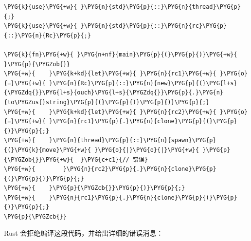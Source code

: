 \begin{Verbatim}[commandchars=\\\{\},breaklines=true,breakanywhere=true,fontsize=\codefont,xleftmargin=17bp]
\PYG{k}{use}\PYG{+w}{ }\PYG{n}{std}\PYG{p}{::}\PYG{n}{thread}\PYG{p}{;}
\PYG{k}{use}\PYG{+w}{ }\PYG{n}{std}\PYG{p}{::}\PYG{n}{rc}\PYG{p}{::}\PYG{n}{Rc}\PYG{p}{;}

\PYG{k}{fn}\PYG{+w}{ }\PYG{n+nf}{main}\PYG{p}{(}\PYG{p}{)}\PYG{+w}{ }\PYG{p}{\PYGZob{}}
\PYG{+w}{    }\PYG{k+kd}{let}\PYG{+w}{ }\PYG{n}{rc1}\PYG{+w}{ }\PYG{o}{=}\PYG{+w}{ }\PYG{n}{Rc}\PYG{p}{::}\PYG{n}{new}\PYG{p}{(}\PYG{l+s}{\PYGZdq{}}\PYG{l+s}{ouch}\PYG{l+s}{\PYGZdq{}}\PYG{p}{.}\PYG{n}{to\PYGZus{}string}\PYG{p}{(}\PYG{p}{)}\PYG{p}{)}\PYG{p}{;}
\PYG{+w}{    }\PYG{k+kd}{let}\PYG{+w}{ }\PYG{n}{rc2}\PYG{+w}{ }\PYG{o}{=}\PYG{+w}{ }\PYG{n}{rc1}\PYG{p}{.}\PYG{n}{clone}\PYG{p}{(}\PYG{p}{)}\PYG{p}{;}
\PYG{+w}{    }\PYG{n}{thread}\PYG{p}{::}\PYG{n}{spawn}\PYG{p}{(}\PYG{k}{move}\PYG{+w}{ }\PYG{o}{|}\PYG{o}{|}\PYG{+w}{ }\PYG{p}{\PYGZob{}}\PYG{+w}{  }\PYG{c+c1}{// 错误}
\PYG{+w}{        }\PYG{n}{rc2}\PYG{p}{.}\PYG{n}{clone}\PYG{p}{(}\PYG{p}{)}\PYG{p}{;}
\PYG{+w}{    }\PYG{p}{\PYGZcb{}}\PYG{p}{)}\PYG{p}{;}
\PYG{+w}{    }\PYG{n}{rc1}\PYG{p}{.}\PYG{n}{clone}\PYG{p}{(}\PYG{p}{)}\PYG{p}{;}
\PYG{p}{\PYGZcb{}}
\end{Verbatim}

Rust 会拒绝编译这段代码，并给出详细的错误消息：

